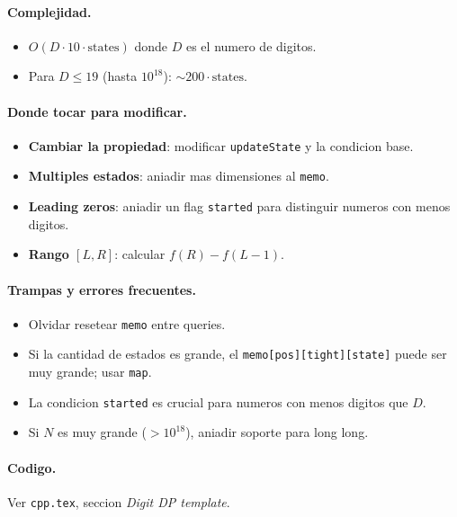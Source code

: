 \paragraph{Complejidad.}
\begin{itemize}\setlength\itemsep{0pt}
	\item $O(D \cdot 10 \cdot \text{states})$ donde $D$ es el numero de digitos.
	\item Para $D \le 19$ (hasta $10^{18}$): $\sim 200 \cdot \text{states}$.
\end{itemize}

\paragraph{Donde tocar para modificar.}
\begin{itemize}\setlength\itemsep{0pt}
	\item \textbf{Cambiar la propiedad}: modificar \texttt{updateState} y la condicion base.
	\item \textbf{Multiples estados}: aniadir mas dimensiones al \texttt{memo}.
	\item \textbf{Leading zeros}: aniadir un flag \texttt{started} para distinguir numeros con menos digitos.
	\item \textbf{Rango $[L, R]$}: calcular $f(R) - f(L-1)$.
\end{itemize}

\paragraph{Trampas y errores frecuentes.}
\begin{itemize}\setlength\itemsep{0pt}
	\item Olvidar resetear \texttt{memo} entre queries.
	\item Si la cantidad de estados es grande, el \texttt{memo[pos][tight][state]} puede ser muy grande; usar \texttt{map}.
	\item La condicion \texttt{started} es crucial para numeros con menos digitos que $D$.
	\item Si $N$ es muy grande ($> 10^{18}$), aniadir soporte para long long.
\end{itemize}

\paragraph{Codigo.}
Ver \texttt{cpp.tex}, seccion \textit{Digit DP template}.

\vspace{0.5em}
